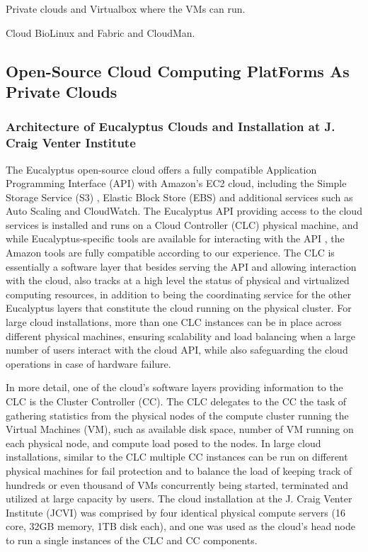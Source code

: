 \documentclass[10pt]{bmc_article}
\newenvironment{bmcformat}{\baselineskip20pt\sloppy\setboolean{publ}{false}}{\baselineskip20pt\sloppy}
\begin{document}
\begin{bmcformat}
Private clouds and Virtualbox where the VMs can run. \pb

Cloud BioLinux and Fabric and CloudMan. \pb


\subsection*{Open-Source Cloud Computing PlatForms As Private Clouds} 

\subsubsection*{Architecture of Eucalyptus Clouds and Installation at J. Craig Venter Institute}

The Eucalyptus open-source cloud \cite{euca} offers a fully compatible Application Programming Interface (API) with Amazon’s EC2 cloud, 
including the Simple Storage  Service (S3) \cite{s3},  Elastic Block Store (EBS) \cite{EBS} and additional services such as Auto Scaling and 
CloudWatch. The Eucalyptus API providing access to the cloud services is installed and runs on a Cloud Controller (CLC) physical machine,
and while Eucalyptus-specific tools are available for interacting with the API \cite{euca2ools}, the Amazon tools \cite{aws2ools} are fully 
compatible according to our experience. The CLC is essentially a software layer that besides serving the API and allowing interaction with 
the cloud, also tracks at a high level the status of physical and virtualized computing resources, in addition to being the coordinating service 
for the other Eucalyptus layers that constitute the cloud running on the physical cluster. For large cloud installations, more than one CLC
instances can be in place across different physical machines, ensuring scalability and load balancing when a large number of users 
interact with the cloud API, while also safeguarding the cloud operations in case of hardware failure.

In more detail, one of the cloud's software layers providing information to the CLC is the Cluster Controller (CC). The CLC delegates to the CC  
the task of gathering statistics from the physical nodes of the compute cluster running the Virtual Machines (VM), such as available disk space, 
number of VM running on each physical node, and compute load posed to the nodes.  In large cloud installations, similar to the CLC multiple 
CC instances can be run on different physical machines for fail protection and to balance the load of keeping track of hundreds or even 
thousand of VMs concurrently being started, terminated and utilized at large capacity by users. The cloud installation at  the J. Craig Venter 
Institute (JCVI) was comprised by four identical physical compute servers (16 core, 32GB memory, 1TB disk each), and one was used as the cloud's
head node to run a single instances of the CLC and CC components.


\end{bmcformat}
\end{document}
